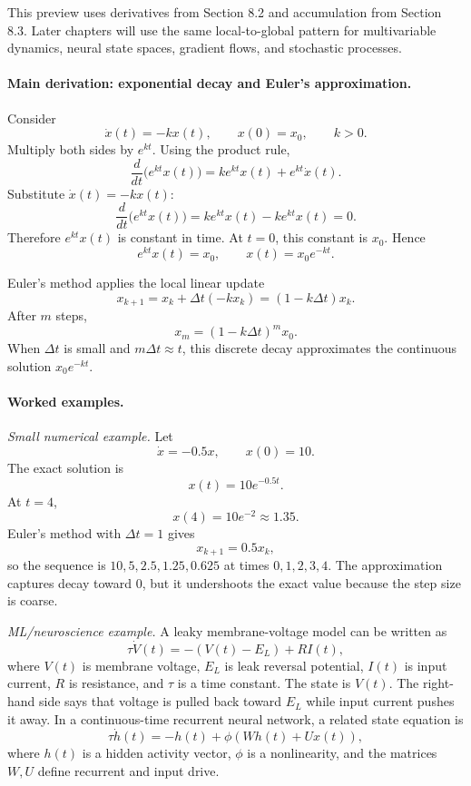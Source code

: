 This preview uses derivatives from Section 8.2 and accumulation from Section 8.3. Later chapters will use the same local-to-global pattern for multivariable dynamics, neural state spaces, gradient flows, and stochastic processes.

\paragraph{Main derivation: exponential decay and Euler's approximation.}
Consider
\[
\dot x(t)=-kx(t),
\qquad
x(0)=x_0,
\qquad
k>0.
\]
Multiply both sides by \(e^{kt}\). Using the product rule,
\[
\frac{d}{dt}\bigl(e^{kt}x(t)\bigr)
=ke^{kt}x(t)+e^{kt}\dot x(t).
\]
Substitute \(\dot x(t)=-kx(t)\):
\[
\frac{d}{dt}\bigl(e^{kt}x(t)\bigr)
=ke^{kt}x(t)-ke^{kt}x(t)=0.
\]
Therefore \(e^{kt}x(t)\) is constant in time. At \(t=0\), this constant is \(x_0\). Hence
\[
e^{kt}x(t)=x_0,
\qquad
x(t)=x_0e^{-kt}.
\]

Euler's method applies the local linear update
\[
x_{k+1}=x_k+\Delta t(-kx_k)
=(1-k\Delta t)x_k.
\]
After \(m\) steps,
\[
x_m=(1-k\Delta t)^m x_0.
\]
When \(\Delta t\) is small and \(m\Delta t\approx t\), this discrete decay approximates the continuous solution \(x_0e^{-kt}\).

\paragraph{Worked examples.}
\emph{Small numerical example.} Let
\[
\dot x=-0.5x,
\qquad
x(0)=10.
\]
The exact solution is
\[
x(t)=10e^{-0.5t}.
\]
At \(t=4\),
\[
x(4)=10e^{-2}\approx 1.35.
\]
Euler's method with \(\Delta t=1\) gives
\[
x_{k+1}=0.5x_k,
\]
so the sequence is \(10,5,2.5,1.25,0.625\) at times \(0,1,2,3,4\). The approximation captures decay toward \(0\), but it undershoots the exact value because the step size is coarse.

\emph{ML/neuroscience example.} A leaky membrane-voltage model can be written as
\[
\tau\dot V(t)=-(V(t)-E_L)+RI(t),
\]
where \(V(t)\) is membrane voltage, \(E_L\) is leak reversal potential, \(I(t)\) is input current, \(R\) is resistance, and \(\tau\) is a time constant. The state is \(V(t)\). The right-hand side says that voltage is pulled back toward \(E_L\) while input current pushes it away. In a continuous-time recurrent neural network, a related state equation is
\[
\tau \dot h(t)=-h(t)+\phi(Wh(t)+Ux(t)),
\]
where \(h(t)\) is a hidden activity vector, \(\phi\) is a nonlinearity, and the matrices \(W,U\) define recurrent and input drive.

